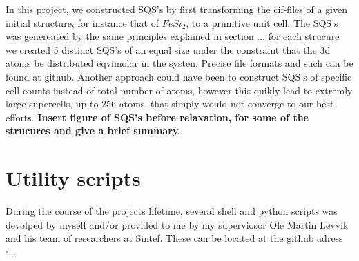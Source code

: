 In this project, we constructed SQS's by first transforming the cif-files of a given initial structure, for instance that of $FeSi_2$, to a primitive unit cell. The SQS's was genereated by the same principles explained in section .., for each strucure we created 5 distinct SQS's of an equal size under the constraint that the 3d atoms be distributed eqvimolar in the systen. Precise file formats and such can be found at github. Another approach could have been to construct SQS's of specific cell counts instead of total number of atoms, however this quikly lead to extremly large supercells, up to 256 atoms, that simply would not converge to our best efforts. 
\textbf{Insert figure of SQS's before relaxation, for some of the strucures and give a brief summary.}

\section{Utility scripts}
During the course of the projects lifetime, several shell and python scripts was devolped by myself and/or provided to me by my superviosor Ole Martin Løvvik and his team of researchers at Sintef. These can be located at the github adress :...